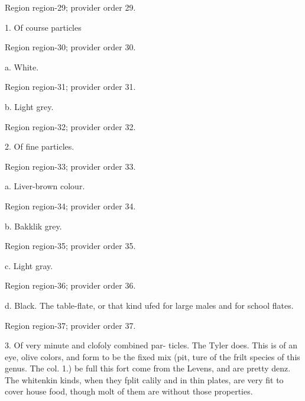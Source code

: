 \documentclass[11pt]{article}
\begin{document}
{\scriptsize\color{gray} Region region-29; provider order 29.\par}
\medskip

1. Of course particles
\par

{\scriptsize\color{gray} Region region-30; provider order 30.\par}
\medskip

a. White.
\par

{\scriptsize\color{gray} Region region-31; provider order 31.\par}
\medskip

b. Light grey.
\par

{\scriptsize\color{gray} Region region-32; provider order 32.\par}
\medskip

2. Of fine particles.
\par

{\scriptsize\color{gray} Region region-33; provider order 33.\par}
\medskip

a. Liver-brown colour.
\par

{\scriptsize\color{gray} Region region-34; provider order 34.\par}
\medskip

b. Bakklik grey.
\par

{\scriptsize\color{gray} Region region-35; provider order 35.\par}
\medskip

c. Light gray.
\par

{\scriptsize\color{gray} Region region-36; provider order 36.\par}
\medskip

d. Black. The table-flate, or that kind ufed for large males and for school flates.
\par

{\scriptsize\color{gray} Region region-37; provider order 37.\par}
\medskip

3. Of very minute and clofoly combined par-
ticles. The Tyler does. This is of an eye, olive colors, and form to be the fixed mix (pit, ture of the frilt species of this genus. The col. 1.) be full this fort come from the Levens, and are pretty denz. The whitenkin kinds, when they fplit calily and in thin plates, are very fit to cover house food, though molt of them are without those properties.
\par
\end{document}
